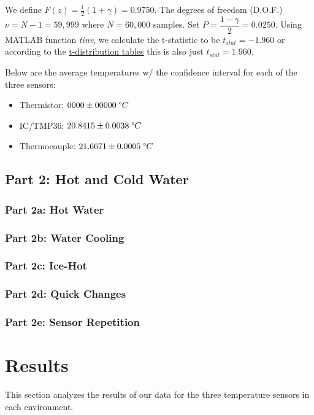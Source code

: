 \documentclass{article}
\begin{document}
We define $F(z) = \frac{1}{2}(1+\gamma) = 0.9750$. The degrees of freedom (D.O.F.) $\nu = N - 1 = 59,999$ where $N=60,000$ samples. Set $P=\dfrac{1-\gamma}{2}=0.0250$. Using MATLAB function \textit{tinv}, we calculate the t-statistic to be $t_{stat} = -1.960$ or according to the \hyperlink{1}{t-distribution tables} this is also just $t_{stat}=1.960$.

Below are the average temperatures w/ the confidence interval for each of the three sensors:
\begin{itemize}
    \item Thermistor: \(0000 \pm 00000\; \degree C \)
    \item IC/TMP36: \(20.8415 \pm 0.0038\; \degree C\)
    \item Thermocouple: \(21.6671 \pm 0.0005\; \degree C\)
\end{itemize}

\subsection{Part 2: Hot and Cold Water}

\subsubsection{Part 2a: Hot Water} %



\subsubsection{Part 2b: Water Cooling} %


\subsubsection{Part 2c: Ice-Hot} %


\subsubsection{Part 2d: Quick Changes} %


\subsubsection{Part 2e: Sensor Repetition} %



\section{Results}
This section analyzes the results of our data for the three temperature sensors in each environment.
\end{document}
